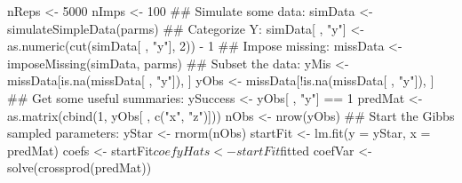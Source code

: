 \begin{Schunk}
\begin{Sinput}
 nReps <- 5000
 nImps <- 100
 ## Simulate some data:
 simData <- simulateSimpleData(parms)
 ## Categorize Y:
 simData[ , "y"] <- as.numeric(cut(simData[ , "y"], 2)) - 1
 ## Impose missing:
 missData <- imposeMissing(simData, parms)
 ## Subset the data:
 yMis <- missData[is.na(missData[ , "y"]), ]
 yObs <- missData[!is.na(missData[ , "y"]), ]
 ## Get some useful summaries:
 ySuccess <- yObs[ , "y"] == 1
 predMat <- as.matrix(cbind(1, yObs[ , c("x", "z")]))
 nObs <- nrow(yObs)
 ## Start the Gibbs sampled parameters:
 yStar <- rnorm(nObs)
 startFit <- lm.fit(y = yStar, x = predMat)
 coefs <- startFit$coef
 yHats <- startFit$fitted
 coefVar <- solve(crossprod(predMat))
\end{Sinput}
\end{Schunk}
